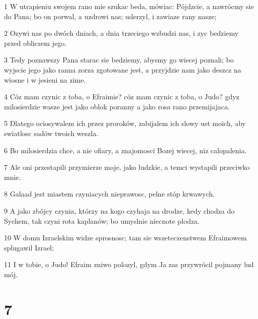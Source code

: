 \par 1 W utrapieniu swojem rano mie szukac beda, mówiac: Pójdzcie, a nawrócmy sie do Pana; bo on porwal, a uzdrowi nas; uderzyl, i zawiaze rany nasze;
\par 2 Ozywi nas po dwóch dniach, a dnia trzeciego wzbudzi nas, i zyc bedziemy przed obliczem jego.
\par 3 Tedy poznawszy Pana starac sie bedziemy, abysmy go wiecej poznali; bo wyjscie jego jako ranna zorza zgotowane jest, a przyjdzie nam jako deszcz na wiosne i w jesieni na zime.
\par 4 Cóz mam czynic z toba, o Efraimie? cóz mam czynic z toba, o Judo? gdyz milosierdzie wasze jest jako oblok poranny a jako rosa rano przemijajaca.
\par 5 Dlatego ociosywalem ich przez proroków, zabijalem ich slowy ust moich, aby swiatlosc sadów twoich weszla.
\par 6 Bo milosierdzia chce, a nie ofiary, a znajomosci Bozej wiecej, niz calopalenia.
\par 7 Ale oni przestapili przymierze moje, jako ludzkie, a temci wystapili przeciwko mnie.
\par 8 Galaad jest miastem czyniacych nieprawosc, pelne stóp krwawych.
\par 9 A jako zbójcy czynia, którzy na kogo czyhaja na drodze, kedy chodza do Sychem, tak czyni rota kaplanów; bo umyslnie niecnote plodza.
\par 10 W domu Izraelskim widze sprosnosc; tam sie wszeteczenstwem Efraimowem splugawil Izrael;
\par 11 I w tobie, o Judo! Efraim zniwo polozyl, gdym Ja zas przywrócil pojmany lud mój.

\chapter{7}

